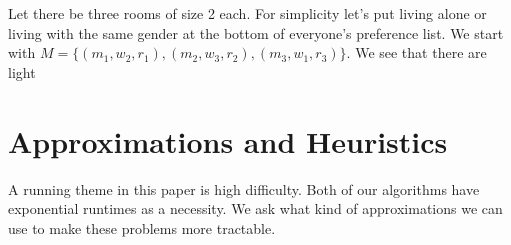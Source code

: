 \documentclass[11pt]{article}
\begin{document}
Let there be three rooms of size 2 each. For simplicity let's put living alone or living with the same gender at the bottom of everyone's preference list. We start with $M = \{(m_1, w_2, r_1), (m_2, w_3, r_2), (m_3, w_1, r_3)\}$. We see that there are light 



\section*{Approximations and Heuristics}
A running theme in this paper is high difficulty. Both of our algorithms have exponential runtimes as a necessity. We ask what kind of approximations we can use to make these problems more tractable.
\end{document}
